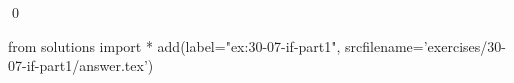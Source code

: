 
\begin{ex}
  \label{ex:30-07-if-part1}
  
  \qed
\end{ex}
\begin{python0}
from solutions import *
add(label="ex:30-07-if-part1",
    srcfilename='exercises/30-07-if-part1/answer.tex')
\end{python0}
